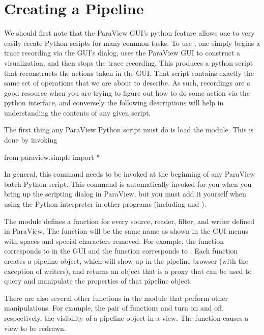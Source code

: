 \section{Creating a Pipeline}
\label{sec:CreatingAPipeline}

We should first note that the ParaView GUI's python  feature
allows one to very easily create Python scripts for many common
tasks. To use , one simply begins a trace recording via the GUI's
 dialog, uses the ParaView GUI to construct a
visualization, and then stops the trace recording. This produces a
python script that reconstructs the actions taken in the GUI. That
script contains exactly the same set of operations that we are
about to describe. As such,  recordings are a good resource when
you are trying to figure out how to do some action via the python
interface, and conversely the following descriptions will help in
understanding the contents of any given  script.

The first thing any ParaView Python script must do is load the
 module.  This is done by invoking
\begin{python}
from paraview.simple import *
\end{python}
In general, this command needs to be invoked at the beginning of any
ParaView batch Python script.  This command is automatically invoked for
you when you bring up the scripting dialog in ParaView, but you must add it
yourself when using the Python interpreter in other programs (including
 and ).

The  module defines a function for every source,
reader, filter, and writer defined in ParaView.  The function will be the
same name as shown in the GUI menus with spaces and special characters
removed.  For example, the  function corresponds to
 \ra {} in the GUI and the 
function corresponds to  \ra {} \ra {}.  Each function creates a pipeline object, which will show up
in the pipeline browser (with the exception of writers), and returns an
object that is a proxy that can be used to query and manipulate the
properties of that pipeline object.

There are also several other functions in the 
module that perform other manipulations.  For example, the pair of
functions  and  turn on and off, respectively,
the visibility of a pipeline object in a view.  The 
function causes a view to be redrawn.

